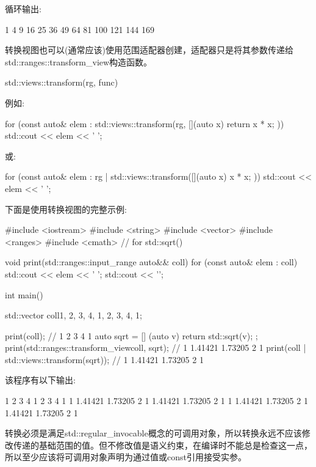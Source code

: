 循环输出:

\begin{shell}
1 4 9 16 25 36 49 64 81 100 121 144 169
\end{shell}


转换视图也可以(通常应该)使用范围适配器创建，适配器只是将其参数传递给std::ranges::transform\_view构造函数。

\begin{cpp}
std::views::transform(rg, func)
\end{cpp}

例如:

\begin{cpp}
for (const auto& elem : std::views::transform(rg, [](auto x) {
						return x * x;
					})) {
	std::cout << elem << ' ';
}
\end{cpp}

或:

\begin{cpp}
for (const auto& elem : rg | std::views::transform([](auto x) {
						x * x;
					})) {
	std::cout << elem << ' ';
}
\end{cpp}

下面是使用转换视图的完整示例:


\begin{cpp}
#include <iostream>
#include <string>
#include <vector>
#include <ranges>
#include <cmath> // for std::sqrt()

void print(std::ranges::input_range auto&& coll)
{
	for (const auto& elem : coll) {
		std::cout << elem << ' ';
	}
	std::cout << '\n';
}

int main()
{
	std::vector coll{1, 2, 3, 4, 1, 2, 3, 4, 1};
	
	print(coll); // 1 2 3 4 1
	auto sqrt = [] (auto v) { return std::sqrt(v); };
	print(std::ranges::transform_view{coll, sqrt}); // 1 1.41421 1.73205 2 1
	print(coll | std::views::transform(sqrt)); // 1 1.41421 1.73205 2 1
}
\end{cpp}

该程序有以下输出:

\begin{shell}
1 2 3 4 1 2 3 4 1
1 1.41421 1.73205 2 1 1.41421 1.73205 2 1
1 1.41421 1.73205 2 1 1.41421 1.73205 2 1
\end{shell}

转换必须是满足std::regular\_invocable概念的可调用对象，所以转换永远不应该修改传递的基础范围的值。但不修改值是语义约束，在编译时不能总是检查这一点，所以至少应该将可调用对象声明为通过值或const引用接受实参。

